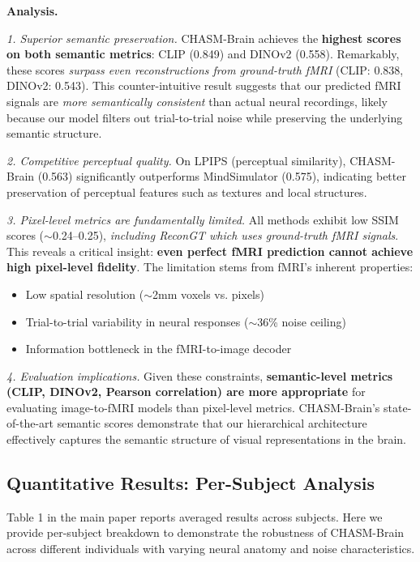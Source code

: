 \textbf{Analysis.}

\textit{1. Superior semantic preservation.}
CHASM-Brain achieves the \textbf{highest scores on both semantic metrics}:
CLIP (0.849) and DINOv2 (0.558). Remarkably, these scores \textit{surpass even
reconstructions from ground-truth fMRI} (CLIP: 0.838, DINOv2: 0.543).
This counter-intuitive result suggests that our predicted fMRI signals are
\textit{more semantically consistent} than actual neural recordings,
likely because our model filters out trial-to-trial noise while preserving
the underlying semantic structure.

\textit{2. Competitive perceptual quality.}
On LPIPS (perceptual similarity), CHASM-Brain (0.563) significantly outperforms
MindSimulator (0.575), indicating better preservation of perceptual features
such as textures and local structures.

\textit{3. Pixel-level metrics are fundamentally limited.}
All methods exhibit low SSIM scores ($\sim$0.24--0.25), \textit{including ReconGT
which uses ground-truth fMRI signals}. This reveals a critical insight:
\textbf{even perfect fMRI prediction cannot achieve high pixel-level fidelity}.
The limitation stems from fMRI's inherent properties:
\begin{itemize}
    \item Low spatial resolution ($\sim$2mm voxels vs. pixels)
    \item Trial-to-trial variability in neural responses ($\sim$36\% noise ceiling)
    \item Information bottleneck in the fMRI-to-image decoder
\end{itemize}

\textit{4. Evaluation implications.}
Given these constraints, \textbf{semantic-level metrics (CLIP, DINOv2, Pearson correlation)
are more appropriate} for evaluating image-to-fMRI models than pixel-level metrics.
CHASM-Brain's state-of-the-art semantic scores demonstrate that our hierarchical
architecture effectively captures the semantic structure of visual representations in the brain.


\subsection{Quantitative Results: Per-Subject Analysis}
\label{sec:supp_per_subject}

Table 1 in the main paper reports averaged results across subjects.
Here we provide per-subject breakdown to demonstrate the robustness of CHASM-Brain
across different individuals with varying neural anatomy and noise characteristics.

